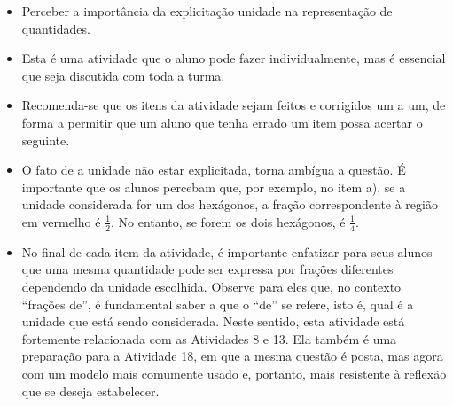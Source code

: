 \begin{atividade}\label{chap2-ativ18}
\objetivos
\begin{itemize} %
    \item       Perceber a importância da explicitação unidade na representação de quantidades.
\end{itemize} %

\discussoes
\begin{itemize} %
    \item       Esta é uma atividade que o aluno pode fazer individualmente, mas é essencial que seja discutida com toda a turma.
    \item       Recomenda-se que os itens da atividade sejam feitos e corrigidos um a um, de forma a permitir que um aluno que tenha errado um item possa acertar o seguinte.
    \item       O fato de a unidade não estar explicitada, torna ambígua a questão. É importante que os alunos percebam que, por exemplo, no item a), se a unidade considerada for um dos hexágonos, a fração correspondente à região em vermelho é $\frac{1}{2}$. No entanto, se forem os dois hexágonos, é $\frac{1}{4}$.
    \item       No final de cada item da atividade, é importante enfatizar para seus alunos que uma mesma quantidade pode ser expressa por frações diferentes dependendo da unidade escolhida. Observe para eles que, no contexto       ``frações de'', é fundamental saber a que o       ``de''     se refere, isto é, qual é a unidade que está sendo considerada. Neste sentido, esta atividade está fortemente relacionada com as Atividades 8 e 13. Ela também é uma preparação para a Atividade 18, em que a mesma questão é posta, mas agora com um modelo mais comumente usado e, portanto, mais resistente à reflexão que se deseja estabelecer.
\end{itemize} %


\end{atividade}
